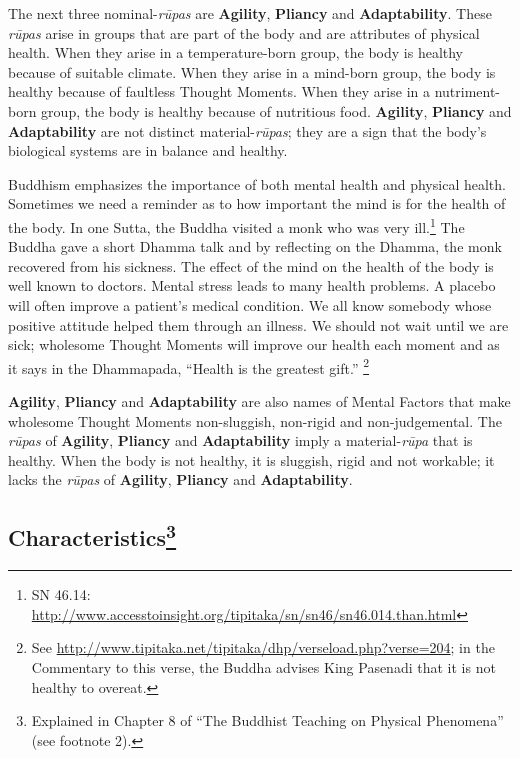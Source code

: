 The next three nominal-\textit{rūpas} are \textbf{Agility}, \textbf{Pliancy} and \textbf{Adaptability}. These \textit{rūpas} arise in groups that are part of the body and are attributes of physical health. When they arise in a temperature-born group, the body is healthy because of suitable climate. When they arise in a mind-born group, the body is healthy because of faultless Thought Moments. When they arise in a nutriment-born group, the body is healthy because of nutritious food. \textbf{Agility}, \textbf{Pliancy} and \textbf{Adaptability} are not distinct material-\textit{rūpas}; they are a sign that the body’s biological systems are in balance and healthy.

Buddhism emphasizes the importance of both mental health and physical health. Sometimes we need a reminder as to how important the mind is for the health of the body. In one Sutta, the Buddha visited a monk who was very ill.\footnote{SN 46.14: \url{http://www.accesstoinsight.org/tipitaka/sn/sn46/sn46.014.than.html}} The Buddha gave a short Dhamma talk and by reflecting on the Dhamma, the monk recovered from his sickness. The effect of the mind on the health of the body is well known to doctors. Mental stress leads to many health problems. A placebo will often improve a patient’s medical condition. We all know somebody whose positive attitude helped them through an illness. We should not wait until we are sick; wholesome Thought Moments will improve our health each moment and as it says in the Dhammapada, “Health is the greatest gift.” \footnote{See \url{http://www.tipitaka.net/tipitaka/dhp/verseload.php?verse=204}; in the Commentary to this verse, the Buddha advises King Pasenadi that it is not healthy to overeat.}

\textbf{Agility}, \textbf{Pliancy} and \textbf{Adaptability} are also names of Mental Factors that make wholesome Thought Moments non-sluggish, non-rigid and non-judgemental. The \textit{rūpas} of \textbf{Agility}, \textbf{Pliancy} and \textbf{Adaptability} imply a material-\textit{rūpa} that is healthy. When the body is not healthy, it is sluggish, rigid and not workable; it lacks the \textit{rūpas} of \textbf{Agility}, \textbf{Pliancy} and \textbf{Adaptability}.

\subsection*{Characteristics\footnote{Explained in Chapter 8 of “The Buddhist Teaching on Physical Phenomena” (see footnote 2).}}

